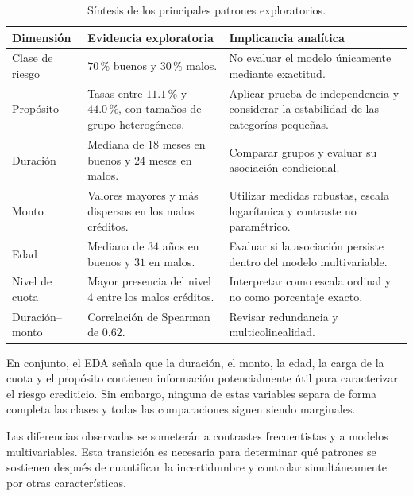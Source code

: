 \begin{table}[H]
    \centering
    \caption{Síntesis de los principales patrones exploratorios.}
    \label{tab:sintesis-eda}

    \begin{tabularx}{0.94\textwidth}{
        @{}
        >{\raggedright\arraybackslash}p{2.8cm}
        X
        >{\raggedright\arraybackslash}p{4.1cm}
        @{}
    }
        \toprule
        Dimensión
        & Evidencia exploratoria
        & Implicancia analítica \\
        \midrule

        Clase de riesgo
        & \(70\,\%\) buenos y \(30\,\%\) malos.
        & No evaluar el modelo únicamente mediante exactitud. \\

        Propósito
        & Tasas entre \(11.1\,\%\) y \(44.0\,\%\), con tamaños de
          grupo heterogéneos.
        & Aplicar prueba de independencia y considerar la estabilidad
          de las categorías pequeñas. \\

        Duración
        & Mediana de \(18\) meses en buenos y \(24\) meses en malos.
        & Comparar grupos y evaluar su asociación condicional. \\

        Monto
        & Valores mayores y más dispersos en los malos créditos.
        & Utilizar medidas robustas, escala logarítmica y contraste no
          paramétrico. \\

        Edad
        & Mediana de \(34\) años en buenos y \(31\) en malos.
        & Evaluar si la asociación persiste dentro del modelo
          multivariable. \\

        Nivel de cuota
        & Mayor presencia del nivel \(4\) entre los malos créditos.
        & Interpretar como escala ordinal y no como porcentaje exacto. \\

        Duración--monto
        & Correlación de Spearman de \(0.62\).
        & Revisar redundancia y multicolinealidad. \\

        \bottomrule
    \end{tabularx}
\end{table}

En conjunto, el EDA señala que la duración, el monto, la edad, la carga
de la cuota y el propósito contienen información potencialmente útil
para caracterizar el riesgo crediticio. Sin embargo, ninguna de estas
variables separa de forma completa las clases y todas las comparaciones
siguen siendo marginales.

Las diferencias observadas se someterán a contrastes frecuentistas y a
modelos multivariables. Esta transición es necesaria para determinar qué
patrones se sostienen después de cuantificar la incertidumbre y controlar
simultáneamente por otras características.
